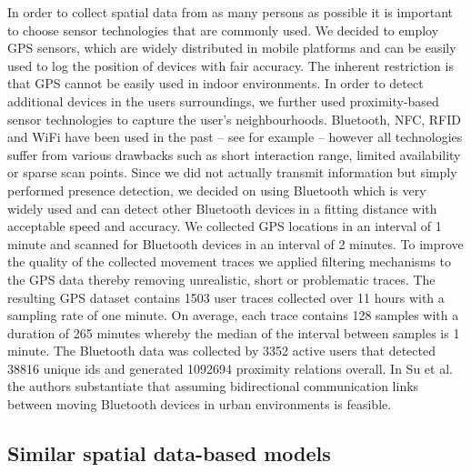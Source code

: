 \documentclass[12pt,a4paper,twoside,openright]{book}
\begin{document}
In order to collect spatial data from as many persons as possible it is important to choose sensor technologies that are commonly used.
%
We decided to employ GPS sensors, which are widely distributed in mobile platforms and can be easily used to log the position of devices with fair accuracy.
%
The inherent restriction is that GPS cannot be easily used in indoor environments.
%
In order to detect additional devices in the users surroundings, we further used proximity-based sensor technologies to capture the user's neighbourhoods.
%
Bluetooth, NFC, RFID and WiFi have been used in the past -- see for example \cite{Makela2007} -- however all technologies suffer from various drawbacks such as short interaction range, limited availability or sparse scan points.
%
Since we did not actually transmit information but simply performed presence detection, we decided on using Bluetooth which is very widely used and can detect other Bluetooth devices in a fitting distance with acceptable speed and accuracy.
%
We collected GPS locations in an interval of 1 minute and scanned for Bluetooth devices in an interval of 2 minutes.
%
To improve the quality of the collected movement traces we applied filtering mechanisms to the GPS data thereby removing unrealistic, short or problematic traces.
%
The resulting GPS dataset contains 1503 user traces collected over 11 hours with a sampling rate of one minute.
%
On average, each trace contains 128 samples with a duration of 265 minutes whereby the median of the interval between samples is 1 minute.
%
The Bluetooth data was collected by 3352 active users that detected 38816 unique ids and generated 1092694 proximity relations overall.
%
In Su et al. \cite{Su2006} the authors substantiate that assuming bidirectional communication links between moving Bluetooth devices in urban environments is feasible.

\subsection{Similar spatial data-based models}
\label{subsec:similar-models}
\end{document}
